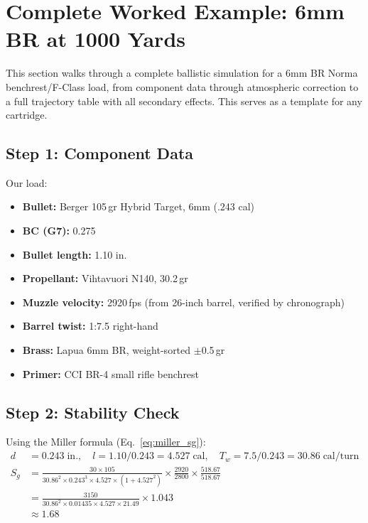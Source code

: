 \documentclass[11pt,twoside,openright]{report}
\begin{document}
\section{Complete Worked Example: 6mm BR at 1000 Yards}
\label{sec:6br_example}

This section walks through a complete ballistic simulation for a 6mm BR Norma benchrest/F-Class load, from component data through atmospheric correction to a full trajectory table with all secondary effects. This serves as a template for any cartridge.

\subsection{Step 1: Component Data}

Our load:
\begin{itemize}[nosep]
  \item \textbf{Bullet:} Berger 105\,gr Hybrid Target, 6mm (.243 cal)
  \item \textbf{BC (G7):} 0.275 \citep{litz2015ballistic}
  \item \textbf{Bullet length:} 1.10 in.
  \item \textbf{Propellant:} Vihtavuori N140, 30.2\,gr
  \item \textbf{Muzzle velocity:} 2920\,fps (from 26-inch barrel, verified by chronograph)
  \item \textbf{Barrel twist:} 1:7.5 right-hand
  \item \textbf{Brass:} Lapua 6mm BR, weight-sorted $\pm$0.5\,gr
  \item \textbf{Primer:} CCI BR-4 small rifle benchrest
\end{itemize}

\subsection{Step 2: Stability Check}

Using the Miller formula (Eq.~\ref{eq:miller_sg}):
\begin{align*}
  d &= 0.243\;\text{in.}, \quad l = 1.10/0.243 = 4.527\;\text{cal}, \quad T_w = 7.5/0.243 = 30.86\;\text{cal/turn} \\
  S_g &= \frac{30 \times 105}{30.86^2 \times 0.243^3 \times 4.527 \times (1 + 4.527^2)} \times \frac{2920}{2800} \times \frac{518.67}{518.67} \\
  &= \frac{3150}{30.86^2 \times 0.01435 \times 4.527 \times 21.49} \times 1.043 \\
  &\approx 1.68
\end{align*}
\end{document}
